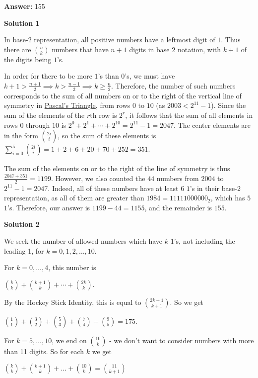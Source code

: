 \begin{enumerate}
 
 \textbf{Answer: }155



\textbf{Solution 1}

In base-$2$ representation, all positive numbers have a leftmost digit of $1$. Thus there are ${n \choose k}$ numbers that have $n+1$ digits in base $2$ notation, with $k+1$ of the digits being $1$'s. 

 In order for there to be more $1$'s than $0$'s, we must have $k+1 > \frac{n+1}{2} \implies k > \frac{n-1}{2} \implies k \ge \frac{n}{2}$. Therefore, the number of such numbers corresponds to the sum of all numbers on or to the right of the vertical line of symmetry in \href{https://artofproblemsolving.com/wiki/index.php?title=Pascal\%27s\_Triangle}{Pascal's Triangle}, from rows $0$ to $10$ (as $2003 < 2^{11}-1$). Since the sum of the elements of the $r$th row is $2^r$, it follows that the sum of all elements in rows $0$ through $10$ is $2^0 + 2^1 + \cdots + 2^{10} = 2^{11}-1 = 2047$. The center elements are in the form ${2i \choose i}$, so the sum of these elements is $\sum_{i=0}^{5} {2i \choose i} = 1 + 2 +6 + 20 + 70 + 252 = 351$.

 The sum of the elements on or to the right of the line of symmetry is thus $\frac{2047 + 351}{2} = 1199$. However, we also counted the $44$ numbers from $2004$ to $2^{11}-1 = 2047$. Indeed, all of these numbers have at least $6$ $1$'s in their base-$2$ representation, as all of them are greater than $1984 = 11111000000_2$, which has $5$ $1$'s. Therefore, our answer is $1199 - 44 = 1155$, and the remainder is $\boxed{155}$.

 



\textbf{Solution 2}

We seek the number of allowed numbers which have $k$ 1's, not including the leading 1, for $k=0, 1, 2, \ldots , 10$.

 For $k=0,\ldots , 4$, this number is

 $\binom{k}{k}+\binom{k+1}{k}+\cdots+\binom{2k}{k}$.

 By the Hockey Stick Identity, this is equal to $\binom{2k+1}{k+1}$. So we get

 $\binom{1}{1}+\binom{3}{2}+\binom{5}{3}+\binom{7}{4}+\binom{9}{5}=175$.

 For $k=5,\ldots , 10$, we end on $\binom{10}{k}$ - we don't want to consider numbers with more than 11 digits. So for each $k$ we get

 $\binom{k}{k}+\binom{k+1}{k}+\ldots+\binom{10}{k}=\binom{11}{k+1}$


\end{enumerate}
